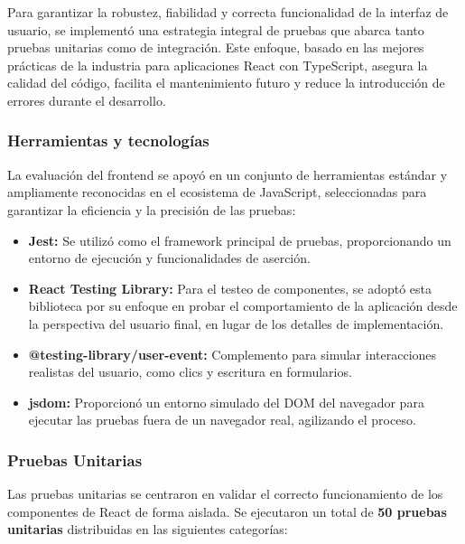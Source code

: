 Para garantizar la robustez, fiabilidad y correcta funcionalidad de la interfaz de usuario, se implementó una estrategia integral de pruebas que abarca tanto pruebas unitarias como de integración. Este enfoque, basado en las mejores prácticas de la industria para aplicaciones React con TypeScript, asegura la calidad del código, facilita el mantenimiento futuro y reduce la introducción de errores durante el desarrollo.

\subsubsection{Herramientas y tecnologías}

La evaluación del frontend se apoyó en un conjunto de herramientas estándar y ampliamente reconocidas en el ecosistema de JavaScript, seleccionadas para garantizar la eficiencia y la precisión de las pruebas:

\begin{itemize}
    \item \textbf{Jest:} Se utilizó como el framework principal de pruebas, proporcionando un entorno de ejecución y funcionalidades de aserción.
    \item \textbf{React Testing Library:} Para el testeo de componentes, se adoptó esta biblioteca por su enfoque en probar el comportamiento de la aplicación desde la perspectiva del usuario final, en lugar de los detalles de implementación.
    \item \textbf{@testing-library/user-event:} Complemento para simular interacciones realistas del usuario, como clics y escritura en formularios.
    \item \textbf{jsdom:} Proporcionó un entorno simulado del DOM del navegador para ejecutar las pruebas fuera de un navegador real, agilizando el proceso.
\end{itemize}

\subsubsection{Pruebas Unitarias}

Las pruebas unitarias se centraron en validar el correcto funcionamiento de los componentes de React de forma aislada. Se ejecutaron un total de \textbf{50 pruebas unitarias} distribuidas en las siguientes categorías:

